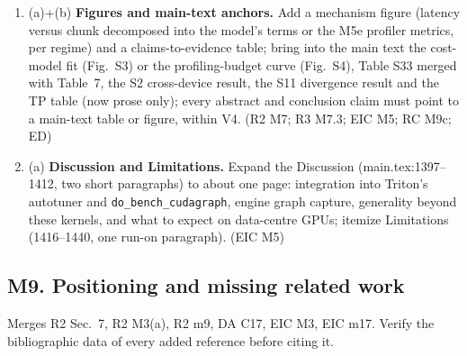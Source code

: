 \documentclass[11pt]{article}
\begin{document}
\begin{enumerate}[label=M8\alph*.]
        latency-weighted share, form-blind, tuned shapes). \emph{Where:}
        main.tex:608--642; Tables 4, 5, 8. (EIC M5; R2 M7; R3 M7.2, m4; DA
        C12)
  \item (a)+(b) \textbf{Figures and main-text anchors.} Add a mechanism figure
        (latency versus chunk decomposed into the model's terms or the M5e
        profiler metrics, per regime) and a claims-to-evidence table; bring
        into the main text the cost-model fit (Fig.~S3) or the
        profiling-budget curve (Fig.~S4), Table S33 merged with Table~7, the
        S2 cross-device result, the S11 divergence result and the TP table
        (now prose only); every abstract and conclusion claim must point to a
        main-text table or figure, within V4. (R2 M7; R3 M7.3; EIC M5; RC
        M9c; ED)
  \item (a) \textbf{Discussion and Limitations.} Expand the Discussion
        (main.tex:1397--1412, two short paragraphs) to about one page:
        integration into Triton's autotuner and \texttt{do\_bench\_cudagraph},
        engine graph capture, generality beyond these kernels, and what to
        expect on data-centre GPUs; itemize Limitations (1416--1440, one
        run-on paragraph). (EIC M5)
\end{enumerate}

\subsection*{M9. Positioning and missing related work}
Merges R2 Sec.~7, R2 M3(a), R2 m9, DA C17, EIC M3, EIC m17. Verify the
bibliographic data of every added reference before citing it.
\end{document}
